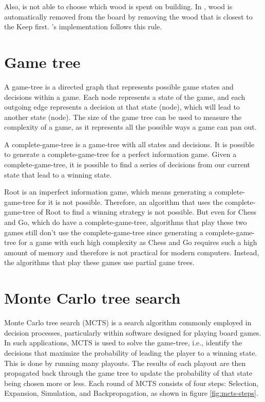 Also, \Marquise{} is not able to choose which wood is spent on building. In \RootV, wood is automatically removed from the board by removing the wood that is closest to the Keep first. \RootOurs{}'s implementation follows this rule.

\section{Game tree}
A \gls{game-tree} is a directed graph that represents possible game states and decisions within a game. Each node represents a state of the game, and each outgoing edge represents a decision at that state (node), which will lead to another state (node). The size of the game tree can be used to measure the complexity of a game, as it represents all the possible ways a game can pan out.

A \gls{complete-game-tree} is a \gls{game-tree} with all states and decisions. It is possible to generate a \gls{complete-game-tree} for a perfect information game. Given a \gls{complete-game-tree}, it is possible to find a series of decisions from our current state that lead to a winning state.

Root is an imperfect information game, which means generating a \gls{complete-game-tree} for it is not possible. Therefore, an algorithm that uses the \gls{complete-game-tree} of Root to find a winning strategy is not possible. But even for Chess and Go, which do have a \gls{complete-game-tree}, algorithms that play these two games still don't use the \gls{complete-game-tree} since generating a \gls{complete-game-tree} for a game with such high complexity as Chess and Go requires such a high amount of memory and therefore is not practical for modern computers. Instead, the algorithms that play these games use partial game trees.


\section{Monte Carlo tree search}
Monte Carlo tree search (MCTS) \cite{Bradberry_Jeff-2015} is a search algorithm commonly employed in decision processes, particularly within software designed for playing board games. In such applications, MCTS is used to solve the \gls{game-tree}, i.e., identify the decisions that maximize the probability of leading the player to a winning state. This is done by running many \glspl{playout}. The results of each \gls{playout} are then propagated back through the game tree to update the probability of that state being chosen more or less. Each round of MCTS consists of four steps: Selection, Expansion, Simulation, and Backpropagation, as shown in figure \ref{fig:mcts-steps}.

